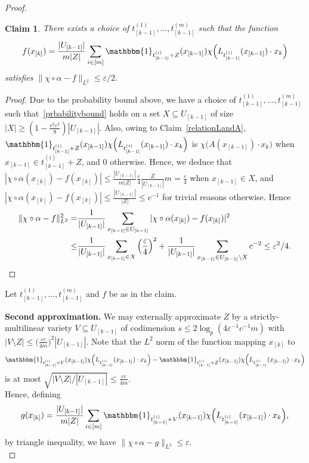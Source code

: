 \documentclass[10pt,a4paper]{amsart}
\newtheorem{claim}{Claim}
\newcommand\id{\mathbbm{1}}
\begin{document}
\begin{proof}
    \begin{claim}
        There exists a choice of $t^{(1)}_{[k-1]}, \dots, t^{(m)}_{[k-1]}$ such that the function 
        \[f(x_{[k]}) = \frac{|U_{[k-1]}|}{m |Z|} \sum_{i \in [m]} \id_{t^{(i)}_{[k-1]} + Z}(x_{[k-1]}) \chi\Big(L_{t^{(i)}_{[k-1]}}(x_{[k-1]}) \cdot x_k\Big)\]
        satisfies $\| \chi \circ \alpha - f\|_{L^2} \leq \varepsilon/2$.
    \end{claim}

    \begin{proof}
        Due to the probability bound above, we have a choice of $t^{(1)}_{[k-1]}, \dots, t^{(m)}_{[k-1]}$ such that~\eqref{prbabilitybound} holds on a set $X \subseteq U_{[k-1]}$ of size $|X| \geq (1 - \frac{c^2\varepsilon^2}{8})|U_{[k-1]}|$. Also, owing to Claim~\ref{relationLandA}, $\id_{t^{(i)}_{[k-1]} + Z}(x_{[k-1]}) \chi\Big(L_{t^{(i)}_{[k-1]}}(x_{[k-1]}) \cdot x_k\Big)$ is $\chi\Big(A(x_{[k-1]}) \cdot x_k\Big)$ when $x_{[k-1]} \in t^{(i)}_{[k-1]} + Z$, and 0 otherwise. Hence, we deduce that $|\chi \circ \alpha(x_{[k]}) - f(x_{[k]})| \leq \frac{|U_{[k-1]}|}{m |Z|} \frac{\varepsilon}{4} \frac{Z}{|U_{[k-1]}|}m = \frac{\varepsilon}{4}$ when $x_{[k-1]} \in X$, and $|\chi \circ \alpha(x_{[k]}) - f(x_{[k]})| \leq \frac{|U_{[k-1]}|}{|Z|} \leq c^{-1}$ for trivial reasons otherwise. Hence
        \begin{align*}\| \chi \circ \alpha - f\|_{L^2}^2 = &\frac{1}{|U_{[k-1]}|} \sum_{x_{[k-1]} \in U_{[k-1]}} |\chi \circ \alpha(x_{[k]}) - f(x_{[k]})|^2\\
        \leq &\frac{1}{|U_{[k-1]}|}\sum_{x_{[k-1]} \in X} \Big(\frac{\varepsilon}{4}\Big)^2 + \frac{1}{|U_{[k-1]}|}\sum_{x_{[k-1]} \in U_{[k-1]} \setminus X}c^{-2} \leq \varepsilon^2/4.\qedhere\end{align*}
    \end{proof}
    
    \vspace{\baselineskip}


    Let $t^{(1)}_{[k-1]}, \dots, t^{(m)}_{[k-1]}$ and $f$ be as in the claim.\\

    \vspace{\baselineskip}

    \noindent\textbf{Second approximation.} We may externally approximate $Z$ by a strictly-multilinear variety $V \subseteq U_{[k-1]}$ of codimension $s \leq 2\log_p (4\varepsilon^{-1} c^{-1} m)$ with $|V \setminus Z| \leq \Big(\frac{\varepsilon c}{4m}\Big)^2|U_{[k-1]}|$. Note that the $L^2$ norm of the function mapping $x_{[k]}$ to  
    \[\id_{t^{(i)}_{[k-1]} + V}(x_{[k-1]}) \chi\Big(L_{t^{(i)}_{[k-1]}}(x_{[k-1]}) \cdot x_k\Big) - \id_{t^{(i)}_{[k-1]} + Z}(x_{[k-1]}) \chi\Big(L_{t^{(i)}_{[k-1]}}(x_{[k-1]}) \cdot x_k\Big)\]
    is at most $\sqrt{|V \setminus Z|/|U_{[k-1]}|} \leq \frac{\varepsilon c}{4m}$.\\
    \indent Hence, defining 
    \[g(x_{[k]}) = \frac{|U_{[k-1]}|}{m |Z|} \sum_{i \in [m]} \id_{t^{(i)}_{[k-1]} + V}(x_{[k-1]}) \chi\Big(L_{t^{(i)}_{[k-1]}}(x_{[k-1]}) \cdot x_k\Big),\]
    by triangle inequality, we have $\| \chi \circ \alpha - g\|_{L^2} \leq \varepsilon$.\\


\end{proof}
\end{document}

